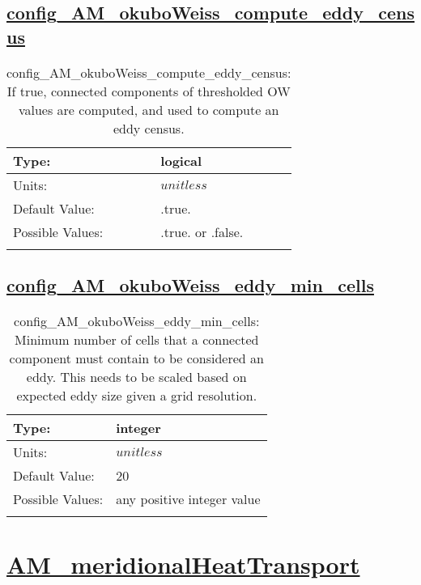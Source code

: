 \subsection[config\_AM\_okuboWeiss\_compute\_eddy\_census]{\hyperref[sec:nm_tab_AM_okuboWeiss]{config\_AM\_okuboWeiss\_compute\_eddy\_census}}
\label{subsec:nm_sec_config_AM_okuboWeiss_compute_eddy_census}
\begin{center}
\begin{longtable}{| p{2.0in} || p{4.0in} |}
    \hline
    Type: & logical \\
    \hline
    Units: & $unitless$ \\
    \hline
    Default Value: & .true. \\
    \hline
    Possible Values: & .true. or .false. \\
    \hline
    \caption{config\_AM\_okuboWeiss\_compute\_eddy\_census: If true, connected components of thresholded OW values are computed, and used to compute an eddy census.}
\end{longtable}
\end{center}
\subsection[config\_AM\_okuboWeiss\_eddy\_min\_cells]{\hyperref[sec:nm_tab_AM_okuboWeiss]{config\_AM\_okuboWeiss\_eddy\_min\_cells}}
\label{subsec:nm_sec_config_AM_okuboWeiss_eddy_min_cells}
\begin{center}
\begin{longtable}{| p{2.0in} || p{4.0in} |}
    \hline
    Type: & integer \\
    \hline
    Units: & $unitless$ \\
    \hline
    Default Value: & 20 \\
    \hline
    Possible Values: & any positive integer value \\
    \hline
    \caption{config\_AM\_okuboWeiss\_eddy\_min\_cells: Minimum number of cells that a connected component must contain to be considered an eddy. This needs to be scaled based on expected eddy size given a grid resolution.}
\end{longtable}
\end{center}
\section[AM\_meridionalHeatTransport]{\hyperref[sec:nm_tab_AM_meridionalHeatTransport]{AM\_meridionalHeatTransport}}
\label{sec:nm_sec_AM_meridionalHeatTransport}
